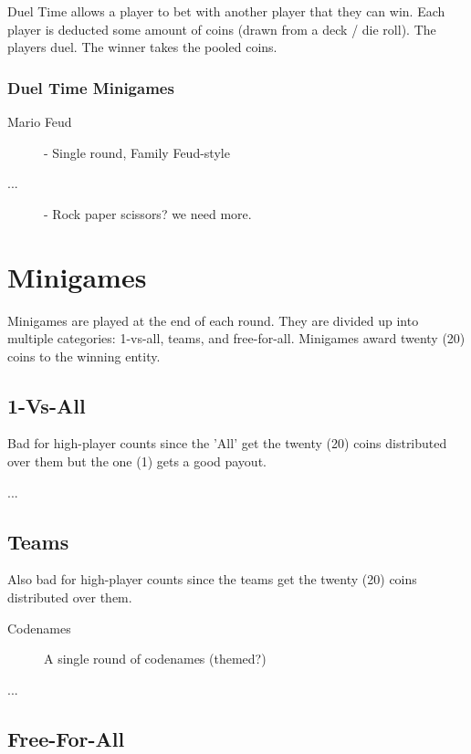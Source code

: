 \documentclass{article}
\begin{document}
Duel Time allows a player to bet with another player that they can win.
Each player is deducted some amount of coins (drawn from a deck / die roll).
The players duel.
The winner takes the pooled coins.

\subsubsection{Duel Time Minigames}

\begin{description}
\item[Mario Feud] - Single round, Family Feud-style
\item[...] - Rock paper scissors? we need more.
\end{description}

\section{Minigames}

Minigames are played at the end of each round.  They are divided up into multiple
categories: 1-vs-all, teams, and free-for-all.  Minigames award twenty (20) coins
to the winning entity.

\subsection{1-Vs-All}

Bad for high-player counts since the 'All' get the twenty (20) coins distributed over them
but the one (1) gets a good payout.

\begin{description}
\item[...]
\end{description}

\subsection{Teams}

Also bad for high-player counts since the teams  get the twenty (20) coins distributed over them.

\begin{description}
\item[Codenames] A single round of codenames (themed?)
\item[...]
\end{description}

\subsection{Free-For-All}
\end{document}
